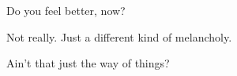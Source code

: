 \null
\vfill
\begin{ally}
Do you feel better, now?
\end{ally}

Not really. Just a different kind of melancholy.

\begin{ally}
Ain't that just the way of things?
\end{ally}
\vfill
\newpage
